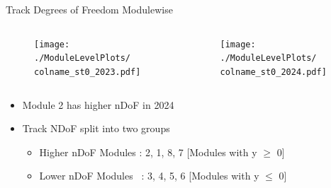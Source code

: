 \begin{frame}{Track Degrees of Freedom Modulewise}
    \newcommand{\colname}{Track_nDoF}
    \begin{columns}
        \begin{column}{0.6\linewidth}
            \begin{figure}
                \centering
                \texttt{[image: ./ModuleLevelPlots/\\colname\_st0\_2023.pdf]}
            \end{figure}
        \end{column}
        \begin{column}{0.6\linewidth}
            \begin{figure}
                \centering
                \texttt{[image: ./ModuleLevelPlots/\\colname\_st0\_2024.pdf]}
            \end{figure}
        \end{column}
    \end{columns}

    \begin{itemize}
        \small
        \item Module 2 has higher nDoF in 2024
        \item Track NDoF split into two groups
        \begin{itemize}
            \item Higher nDoF Modules : 2, 1, 8, 7 [Modules with y $\geq$ 0]
            \item Lower nDoF Modules \ : 3, 4, 5, 6  [Modules with y $\leq$ 0]
        \end{itemize}
    \end{itemize}
\end{frame}

